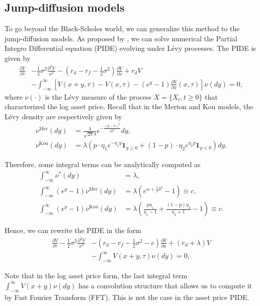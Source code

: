 \subsection{Jump-diffusion models}
To go beyond the Black-Scholes world, we can generalize this method to the jump-diffusion models. As proposed by \citeauthor{CV05} \citeyearpar{CV05}, we can solve numerical the Partial Integro Differential equation (PIDE) evolving under L\'evy processes. The PIDE is given by
\begin{align*}\frac{\partial V}{\partial \tau}&-\frac{1}{2}\sigma^2\frac{\partial^2V}{x^2}-\left(r_d-r_f-\frac{1}{2}\sigma^2\right)\frac{\partial V}{\partial x}+r_d V \\
&-\int_{-\infty}^\infty \left[V(x+y,\tau)-V(x,\tau)-\left(e^y-1\right)\frac{\partial V}{\partial x}(x,\tau)\right]\nu(dy) = 0,
\end{align*}
where $\nu(\cdot)$ is the L\'evy measure of the process $X =\{X_t,t\geq0\}$ that characterized the log asset price. Recall that in the Merton and Kou models, the L\'evy density are respectively given by
\begin{align*}
\nu^\text{Mer}(dy) &= \frac{\lambda}{\sqrt{2\pi}\delta}e^{-\frac{(y-\alpha)^2}{2\delta^2}}dy,\\
\nu^\text{Kou}(dy) &= \lambda\left(p\cdot\eta_1e^{-\eta_1 y} \mathbf{1}_{y\geq0}+(1-p)\cdot\eta_2e^{\eta_2y}\mathbf{1}_{y<0}\right)dy.
\end{align*}

Therefore, some integral terms can be analytically computed as
\begin{align*}
\int_{-\infty}^\infty \nu^\ast(dy) &= \lambda,\\
\int_{-\infty}^\infty (e^y-1)\nu^\text{Mer}(dy) &= \lambda\left(e^{\alpha +\frac{1}{2}\delta^2}-1\right)\equiv c,\\
\int_{-\infty}^\infty (e^y-1)\nu^\text{Kou}(dy) &= \lambda\left(\frac{p\eta_1}{\eta_1-1}+\frac{(1-p)\eta_2}{\eta_2+1}-1\right)\equiv c.
\end{align*}

Hence, we can rewrite the PIDE in the form
\begin{align*}\frac{\partial V}{\partial \tau}-\frac{1}{2}\sigma^2\frac{\partial^2V}{x^2}&-\left(r_d-r_f-\frac{1}{2}\sigma^2 -c\right)\frac{\partial V}{\partial x}+(r_d +\lambda)V \\
&-\int_{-\infty}^\infty V(x+y,\tau)\nu(dy) = 0,
\end{align*}

Note that in the log asset price form, the last integral term $\int_{-\infty}^\infty V(x+y)\nu(dy)$ has a convolution structure that allows us to compute it by Fast Fourier Transform (FFT). This is not the case in the asset price PIDE.

